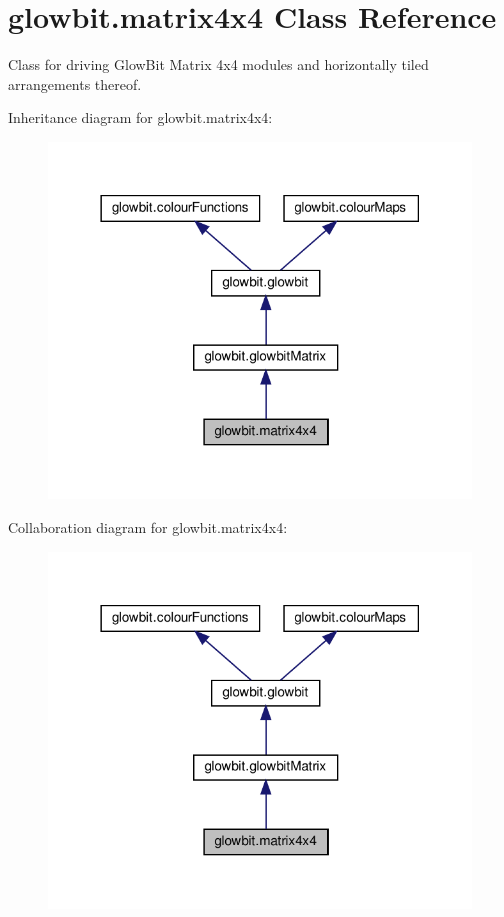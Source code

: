 \hypertarget{classglowbit_1_1matrix4x4}{}\section{glowbit.\+matrix4x4 Class Reference}
\label{classglowbit_1_1matrix4x4}


Class for driving Glow\+Bit Matrix 4x4 modules and horizontally tiled arrangements thereof.  




Inheritance diagram for glowbit.\+matrix4x4\+:\nopagebreak
\begin{figure}[H]
\begin{center}
\leavevmode
\includegraphics[width=318pt]{classglowbit_1_1matrix4x4__inherit__graph}
\end{center}
\end{figure}


Collaboration diagram for glowbit.\+matrix4x4\+:\nopagebreak
\begin{figure}[H]
\begin{center}
\leavevmode
\includegraphics[width=318pt]{classglowbit_1_1matrix4x4__coll__graph}
\end{center}
\end{figure}
